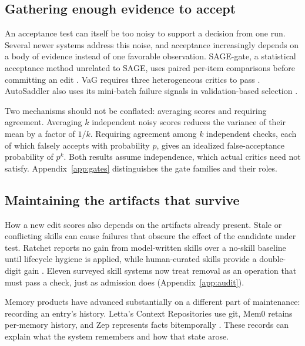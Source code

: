\documentclass[
  11pt,
]{article}
\begin{document}
\subsection{Gathering enough evidence to accept}\label{gathering-enough-evidence-to-accept}

An acceptance test can itself be too noisy to support a decision from one run. Several newer systems address this noise, and acceptance increasingly depends on a body of evidence instead of one favorable observation. SAGE-gate, a statistical acceptance method unrelated to SAGE, uses paired per-item comparisons before committing an edit \cite{wang2026sagegate}. VaG requires three heterogeneous critics to pass \cite{shang2026vag}. AutoSaddler also uses its mini-batch failure signals in validation-based selection \cite{park2026autosaddler}.

Two mechanisms should not be conflated: averaging scores and requiring agreement. Averaging \(k\) independent noisy scores reduces the variance of their mean by a factor of \(1/k\). Requiring agreement among \(k\) independent checks, each of which falsely accepts with probability \(p\), gives an idealized false-acceptance probability of \(p^k\). Both results assume independence, which actual critics need not satisfy. Appendix~\ref{app:gates} distinguishes the gate families and their roles.

\subsection{Maintaining the artifacts that survive}\label{maintaining-the-artifacts-that-survive}

How a new edit scores also depends on the artifacts already present. Stale or conflicting skills can cause failures that obscure the effect of the candidate under test. Ratchet reports no gain from model-written skills over a no-skill baseline until lifecycle hygiene is applied, while human-curated skills provide a double-digit gain \cite{zhang2026ratchet}. Eleven surveyed skill systems now treat removal as an operation that must pass a check, just as admission does \cite{zhang2026librarydrift, wei2026skillsmith, pu2026skillops, wang2026assay} (Appendix~\ref{app:audit}).

Memory products have advanced substantially on a different part of maintenance: recording an entry's history. Letta's Context Repositories use git, Mem0 retains per-memory history, and Zep represents facts bitemporally \cite{letta2026memfs, mem02026history, zep2026facts}. These records can explain what the system remembers and how that state arose.
\end{document}
